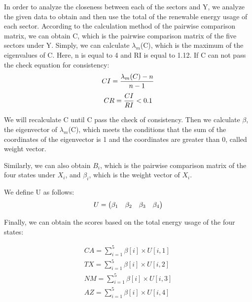 \documentclass[a4paper,11pt]{article}
\begin{document}
\par In order to analyze the closeness between each of the sectors and Y, we analyze the given data to obtain and then use the total of the renewable energy usage of each sector. According to the calculation method of the pairwise comparison matrix, we can obtain C, which is the pairwise comparison matrix of the five sectors under Y. Simply, we can calculate $\lambda_m$(C), which is the maximum of the eigenvalues of C. Here, n is equal to 4 and RI is equal to 1.12.\cite{6} If C can not pass the check equation for consistency:
\begin{equation}
    \centering
    CI=\frac{ \lambda_m(C)-n }{ n-1 }
\end{equation}
\begin{equation}
        \centering
    CR=\frac{ CI }{ RI }<0.1 
\end{equation}

\par We will recalculate C until C pass the check of consistency. Then we calculate $\beta$, the eigenvector of $\lambda_m$(C), which meets the conditions that the sum of the coordinates of the eigenvector is 1 and the coordinates are greater than 0, called weight vector.
\par Similarly, we can also obtain $B_i$, which is the pairwise comparison matrix of the four states under $X_i$, and $\beta_i$, which is the weight vector of $X_i$.
\par We define U as follows: %
\begin{equation}
    \centering
U=\begin{pmatrix} \beta_1 & \beta_2 & \beta_3 & \beta_4\end{pmatrix}
\end{equation}
\par Finally, we can obtain the scores based on the total energy usage of the four states:

\begin{equation}
    \label{AHP_result}
    \begin{array}{l}
    \displaystyle CA=\sum_{i=1}^{5}\beta[i] \times U[i,1] \\
    \displaystyle TX=\sum_{i=1}^{5}\beta[i] \times U[i,2] \\
    \displaystyle NM=\sum_{i=1}^{5}\beta[i] \times U[i,3] \\
    \displaystyle AZ=\sum_{i=1}^{5}\beta[i] \times U[i,4]
    \end{array}
\end{equation}
\end{document}
